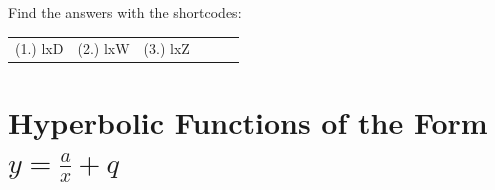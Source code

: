   \label{m39345**end}
\par {} Find the answers with the shortcodes:
 \par \begin{tabular}[h]{cccccc}
 (1.) lxD  &  (2.) lxW  &  (3.) lxZ  & \end{tabular}
%     
%     
%     
      \label{m39341*uid137}
            \section{ Hyperbolic Functions of the Form $y=\frac{a}{x}+q$}
            \nopagebreak
